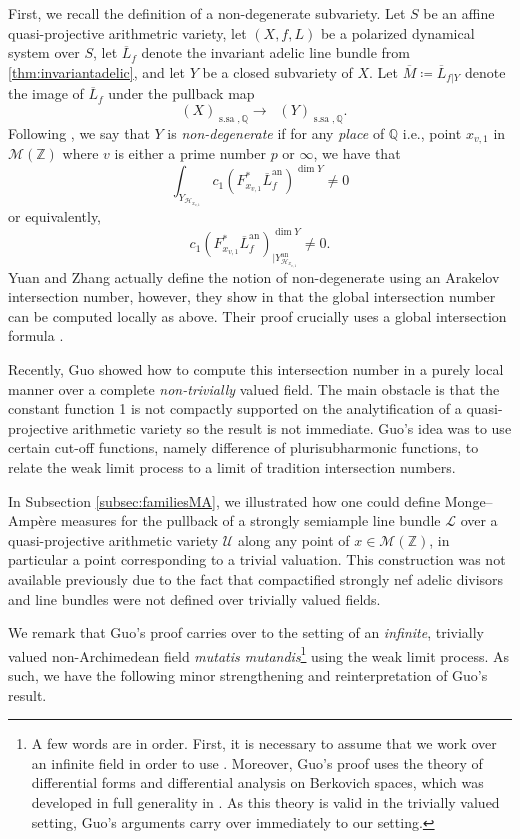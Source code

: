 \documentclass[11pt,reqno]{amsart}
\newcommand{\mZ}{\mathbb{Z}}
\newcommand{\mQ}{\mathbb{Q}}
\newcommand{\cU}{\mathcal{U}}
\newcommand{\cL}{\mathcal{L}}
\newcommand{\sH}{{\mathscr H}}
\newcommand{\sM}{{\mathscr M}}
\theoremstyle{theorem}
\numberwithin{equation}{subsection}
\numberwithin{equation}{subsection}
\theoremstyle{definition}
\theoremstyle{remark}
\numberwithin{equation}{subsubsection} \numberwithin{figure}{section}
\DeclareMathOperator{\an}{an}
\DeclareMathOperator{\aPic}{\widehat{Pic}}
\newcommand{\cdef}[1]{\textsf{\textit{#1}}}
\DeclareMathOperator{\ssa}{s.sa}
\begin{document}
First, we recall the definition of a non-degenerate subvariety. 
Let $S$ be an affine quasi-projective arithmetric variety, let $(X,f,L)$ be a polarized dynamical system over $S$, let $\overline{L}_f$ denote the invariant adelic line bundle from \autoref{thm:invariantadelic}, and let $Y$ be a closed subvariety of $X$. 
Let $\overline{M} \coloneqq \overline{L}_{f|Y}$ denote the image of $\overline{L}_f$ under the pullback map
\[
\aPic(X)_{\ssa,\mQ} \to \aPic(Y)_{\ssa,\mQ}. 
\]
Following \cite[Section 6.2.2 \& Lemma 5.4.4]{YuanZhang:AdelicLineBundles}, we say that $Y$ is \cdef{non-degenerate} if for any \textit{place} of $\mQ$ i.e., point $x_{v,1}$ in $\sM(\mZ)$ where $v$ is either a prime number $p$ or $\infty$, we have that 
\[
\int_{Y_{\sH_{x_{v,1}}}} c_1(F_{{x_{v,1}}}^*\overline{L}_{f}^{\an})^{\dim Y} \neq 0
\]
or equivalently, 
\[
c_1(F_{{x_{v,1}}}^*\overline{L}_{f}^{\an})_{|Y_{\sH_{x_{v,1}}}^{\an}}^{\dim Y} \neq 0. 
\]
Yuan and Zhang actually define the notion of non-degenerate using an Arakelov intersection number, however, they show in \cite[Lemma 5.4.4]{YuanZhang:AdelicLineBundles} that the global intersection number can be computed locally as above. 
Their proof crucially uses a global intersection formula \cite[Th\'eor\`eme 1.4]{ChambertLoirThuillier:MahlerMeasure}. 

Recently, Guo \cite{Guo:Integration} showed how to compute this intersection number in a purely local manner over a complete \textit{non-trivially} valued field.
The main obstacle is that the constant function 1 is not compactly supported on the analytification of a quasi-projective arithmetic variety so the result is not immediate. Guo's idea was to use certain cut-off functions, namely difference of plurisubharmonic functions, to relate the weak limit process to a limit of tradition intersection numbers. 

In Subsection \ref{subsec:familiesMA}, we illustrated how one could define Monge--Amp\`ere measures for the pullback of a strongly semiample line bundle $\cL$ over a quasi-projective arithmetic variety $\cU$ along any point of $x\in \sM(\mZ)$, in particular a point corresponding to a trivial valuation. 
This construction was not available previously due to the fact that compactified strongly nef adelic divisors and line bundles were not defined over trivially valued fields. 

We remark that Guo's proof carries over to the setting of an \textit{infinite}, trivially valued non-Archimedean field \textit{mutatis mutandis}\footnote{A few words are in order. First, it is necessary to assume that we work over an infinite field in order to use \cite[Lemma 3.1]{Guo:Integration}. Moreover, Guo's proof uses the theory of differential forms and differential analysis on Berkovich spaces, which was developed in full generality in \cite{ChambertLoirDucros:FormesDifferentielles}. As this theory is valid in the trivially valued setting, Guo's arguments carry over immediately to our setting.} using the weak limit process. 
As such, we have the following minor strengthening and reinterpretation of Guo's result. 
\end{document}
